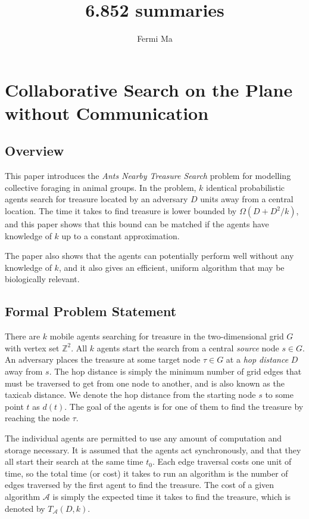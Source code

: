 \documentclass[11pt]{article}
\author{Fermi Ma}
\title{6.852 summaries}
\begin{document}
\maketitle

\section{Collaborative Search on the Plane without Communication}

\subsection{Overview}

This paper introduces the \emph{Ants Nearby Treasure Search} problem for modelling collective foraging in animal groups. In the problem, $k$ identical probabilistic agents search for treasure located by an adversary $D$ units away from a central location. The time it takes to find treasure is lower bounded by $\Omega(D + D^2/k)$, and this paper shows that this bound can be matched if the agents have knowledge of $k$ up to a constant approximation.

The paper also shows that the agents can potentially perform well without any knowledge of $k$, and it also gives an efficient, uniform algorithm that may be biologically relevant.

\subsection{Formal Problem Statement}

There are $k$ mobile agents searching for treasure in the two-dimensional grid $G$ with vertex set $\mathbb{Z}^2$. All $k$ agents start the search from a central \emph{source} node $s \in G$. An adversary places the treasure at some target node $\tau \in G$ at a \emph{hop distance} $D$ away from $s$. The hop distance is simply the minimum number of grid edges that must be traversed to get from one node to another, and is also known as the taxicab distance. We denote the hop distance from the starting node $s$ to some point $t$ as $d(t)$. The goal of the agents is for one of them to find the treasure by reaching the node $\tau$.

The individual agents are permitted to use any amount of computation and storage necessary. It is assumed that the agents act synchronously, and that they all start their search at the same time $t_0$. Each edge traversal costs one unit of time, so the total time (or cost) it takes to run an algorithm is the number of edges traversed by the first agent to find the treasure. The cost of a given algorithm $\mathcal{A}$ is simply the expected time it takes to find the treasure, which is denoted by $T_\mathcal{A}(D,k)$.
\end{document}
